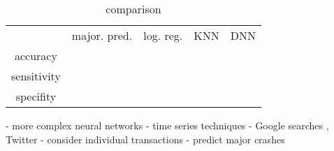 \begin{table}
\centering
\begin{tabular}{c||c|c|c|c}
   & major. pred. & log. reg. & KNN & DNN \\
accuracy & \\
\hline
sensitivity & \\ 
\hline
specifity & 
\end{tabular}
 \caption{comparison}
\end{table}


- more complex neural networks
- time series techniques
- Google searches \cite{SocialMedia2015}, Twitter \cite{Twitter2019}
- consider individual transactions \cite{Classification2015}
- predict major crashes \cite{Musk2021} \cite{China2021} \cite{Binance2021}